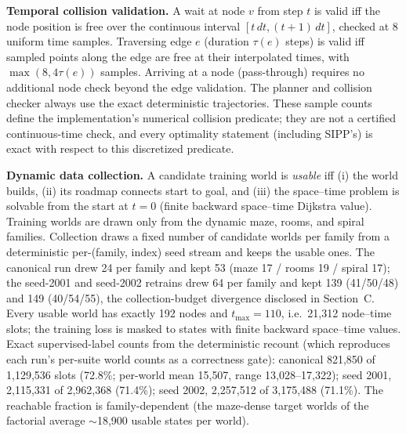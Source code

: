 \documentclass[letterpaper]{article} %
\begin{document}
\textbf{Temporal collision validation.} A wait at node $v$ from step $t$ is valid iff the node position is free over the continuous interval $[t\,dt, (t{+}1)\,dt]$, checked at 8 uniform time samples. Traversing edge $e$ (duration $\tau(e)$ steps) is valid iff sampled points along the edge are free at their interpolated times, with $\max(8, 4\tau(e))$ samples. Arriving at a node (pass-through) requires no additional node check beyond the edge validation. The planner and collision checker always use the exact deterministic trajectories. These sample counts define the implementation's numerical collision predicate; they are not a certified continuous-time check, and every optimality statement (including SIPP's) is exact with respect to this discretized predicate.

\textbf{Dynamic data collection.} A candidate training world is \emph{usable} iff (i) the world builds, (ii) its roadmap connects start to goal, and (iii) the space--time problem is solvable from the start at $t{=}0$ (finite backward space--time Dijkstra value). Training worlds are drawn only from the dynamic maze, rooms, and spiral families. Collection draws a fixed number of candidate worlds per family from a deterministic per-(family, index) seed stream and keeps the usable ones. The canonical run drew 24 per family and kept 53 (maze 17 / rooms 19 / spiral 17); the seed-2001 and seed-2002 retrains drew 64 per family and kept 139 (41/50/48) and 149 (40/54/55), the collection-budget divergence disclosed in Section~C. Every usable world has exactly 192 nodes and $t_{\max}{=}110$, i.e.\ 21{,}312 node--time slots; the training loss is masked to states with finite backward space--time values. Exact supervised-label counts from the deterministic recount (which reproduces each run's per-suite world counts as a correctness gate): canonical 821{,}850 of 1{,}129{,}536 slots (72.8\%; per-world mean 15{,}507, range 13{,}028--17{,}322); seed 2001, 2{,}115{,}331 of 2{,}962{,}368 (71.4\%); seed 2002, 2{,}257{,}512 of 3{,}175{,}488 (71.1\%). The reachable fraction is family-dependent (the maze-dense target worlds of the factorial average $\sim$18{,}900 usable states per world).
\end{document}
